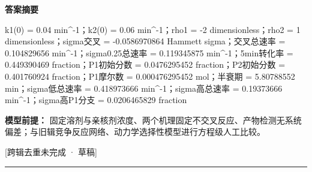 \documentclass[UTF8,11pt,a4paper]{ctexart}
\begin{document}
\noindent\textbf{答案摘要}\par
k1(0) = 0.04 min\textasciicircum{}-1；k2(0) = 0.06 min\textasciicircum{}-1；rho1 = -2 dimensionless；rho2 = 1 dimensionless；sigma交叉 = -0.0586970864 Hammett sigma；交叉总速率 = 0.104829656 min\textasciicircum{}-1；sigma0.25总速率 = 0.119345875 min\textasciicircum{}-1；5min转化率 = 0.449390469 fraction；P1初始分数 = 0.0476295452 fraction；P2初始分数 = 0.401760924 fraction；P1摩尔数 = 0.000476295452 mol；半衰期 = 5.80788552 min；sigma低总速率 = 0.418973666 min\textasciicircum{}-1；sigma高总速率 = 0.19373666 min\textasciicircum{}-1；sigma高P1分支 = 0.0206465829 fraction\par
\noindent\textbf{模型前提：}
固定溶剂与亲核剂浓度、两个机理固定不交叉反应、产物检测无系统偏差；与旧辑竞争反应网络、动力学选择性模型进行方程级人工比较。\par
\noindent\textcolor{red!65!black}{[跨辑去重未完成 · 草稿]} \par
\medskip\hrule\medskip
{}
\end{document}
